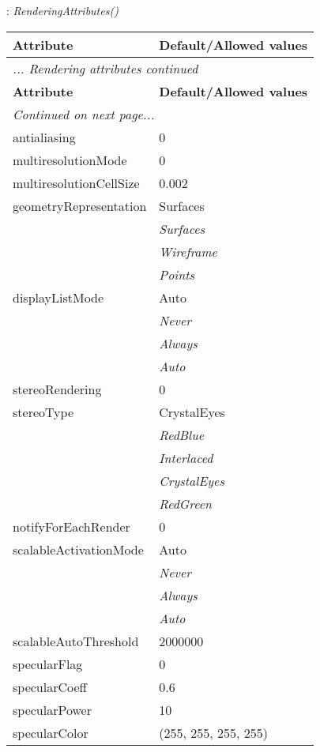 \documentclass[10pt,a4paper]{report}
\begin{document}
\newpage

{}
: {\it RenderingAttributes() }\\[-3mm]

\begin{longtable}{ll}
{\bf Attribute} & {\bf Default/Allowed values} \\
\hline \hline
\endfirsthead
\multicolumn{2}{l}{{\it ... Rendering attributes continued}} \\
{\bf Attribute} & {\bf Default/Allowed values} \\
\hline \hline
\endhead
\hline
\multicolumn{2}{l}{{\it Continued on next page...}} \\
\endfoot
\hline
\endlastfoot

antialiasing  &  0 \\
multiresolutionMode  &  0 \\
multiresolutionCellSize  &  0.002 \\
geometryRepresentation  &  Surfaces   \\
 & {\it  Surfaces} \\
 & {\it  Wireframe} \\
 & {\it  Points} \\
displayListMode  &  Auto   \\
 & {\it  Never} \\
 & {\it  Always} \\
 & {\it  Auto} \\
stereoRendering  &  0 \\
stereoType  &  CrystalEyes   \\
 & {\it  RedBlue} \\
 & {\it  Interlaced} \\
 & {\it  CrystalEyes} \\
 & {\it  RedGreen} \\
notifyForEachRender  &  0 \\
scalableActivationMode  &  Auto   \\
 & {\it  Never} \\
 & {\it  Always} \\
 & {\it  Auto} \\
scalableAutoThreshold  &  2000000 \\
specularFlag  &  0 \\
specularCoeff  &  0.6 \\
specularPower  &  10 \\
specularColor  &  (255, 255, 255, 255) \\

\end{longtable}
\end{document}
